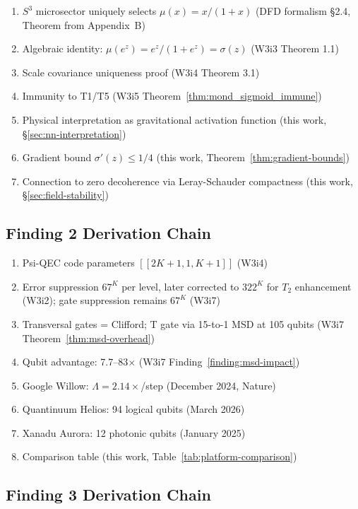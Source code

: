 \documentclass[11pt]{article}
\theoremstyle{definition}
\theoremstyle{remark}
\begin{document}
\begin{enumerate}[nosep]
\item $S^3$ microsector uniquely selects $\mu(x) = x/(1+x)$
  (DFD formalism \S2.4, Theorem from Appendix~B)
\item Algebraic identity: $\mu(e^z) = e^z/(1+e^z) = \sigma(z)$
  (W3i3 Theorem 1.1)
\item Scale covariance uniqueness proof (W3i4 Theorem 3.1)
\item Immunity to T1/T5 (W3i5 Theorem~\ref*{thm:mond_sigmoid_immune})
\item Physical interpretation as gravitational activation function
  (this work, \S\ref{sec:nn-interpretation})
\item Gradient bound $\sigma'(z) \leq 1/4$ (this work,
  Theorem~\ref{thm:gradient-bounds})
\item Connection to zero decoherence via Leray-Schauder compactness
  (this work, \S\ref{sec:field-stability})
\end{enumerate}

\subsection{Finding 2 Derivation Chain}

\begin{enumerate}[nosep]
\item Psi-QEC code parameters $[[2K{+}1,1,K{+}1]]$ (W3i4)
\item Error suppression $67^K$ per level, later corrected to $322^K$ for
  $T_2$ enhancement (W3i2); gate suppression remains $67^K$ (W3i7)
\item Transversal gates = Clifford; T gate via 15-to-1 MSD at 105
  qubits (W3i7 Theorem~\ref*{thm:msd-overhead})
\item Qubit advantage: 7.7--83$\times$ (W3i7 Finding~\ref*{finding:msd-impact})
\item Google Willow: $\Lambda = 2.14\times$/step (December 2024, Nature)
\item Quantinuum Helios: 94 logical qubits (March 2026)
\item Xanadu Aurora: 12 photonic qubits (January 2025)
\item Comparison table (this work, Table~\ref{tab:platform-comparison})
\end{enumerate}

\subsection{Finding 3 Derivation Chain}
\end{document}
